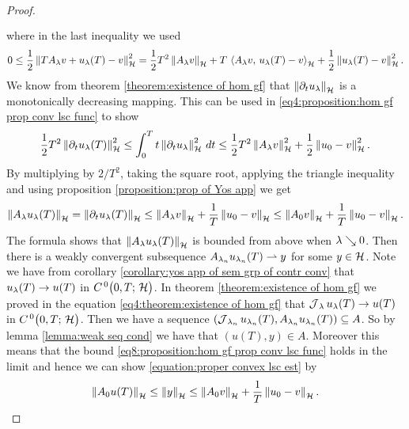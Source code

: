 \begin{proof}
\begin{align}
\begin{split}
		\end{split}
	\end{align}
	where in the last inequality we used
	\begin{align*}
		0\leq 
		\frac{1}{2}\left\Vert T A_\lambda v+u_\lambda(T)-v\right\Vert_{\mathcal{H}}^2
		=\frac{1}{2}T^2\left\Vert A_\lambda v\right\Vert_{\mathcal{H}}
		+T\,\left\langle A_\lambda v,\,u_\lambda(T)-v\right\rangle_{\mathcal{H}}
		+\frac{1}{2}\left\Vert u_\lambda(T)-v\right\Vert_{\mathcal{H}}^2.
	\end{align*}
	We know from theorem \ref{theorem:existence of hom gf} that 
	$ \left\Vert \partial_t u_\lambda\right\Vert_{\mathcal{H}} $ is a monotonically decreasing
	mapping. This can be used in 
	\eqref{eq4:proposition:hom gf prop conv lsc func} to show
	\begin{align*}
		\frac{1}{2}T^2 \left\Vert \partial_t u_\lambda(T)\right\Vert_{\mathcal{H}}^2
		\leq 
		\int_0^T t\left\Vert \partial_t u_\lambda\right\Vert_{\mathcal{H}}^2\,dt
		\leq \frac{1}{2}T^2\left\Vert A_\lambda v\right\Vert_{\mathcal{H}}^2+\frac{1}{2}\left\Vert u_0-v\right\Vert_{\mathcal{H}}^2.
	\end{align*}
	By multiplying by $ 2/T^2 $, taking the square root,
	applying the triangle inequality 
	and using proposition \ref{proposition:prop of Yos app}
	we get 
	\begin{align}\label{eq8:proposition:hom gf prop conv lsc func}
		\left\Vert A_\lambda u_\lambda(T)\right\Vert_{\mathcal{H}}
		=\left\Vert \partial_t u_\lambda(T)\right\Vert_{\mathcal{H}}
		\leq \left\Vert A_\lambda v\right\Vert_{\mathcal{H}}+\frac{1}{T}\left\Vert u_0-v\right\Vert_{\mathcal{H}}
		\leq \left\Vert A_0 v\right\Vert_{\mathcal{H}}+\frac{1}{T}\left\Vert u_0-v\right\Vert_{\mathcal{H}}.
	\end{align}
	The formula shows that $ \left\Vert A_\lambda u_\lambda(T)\right\Vert_{\mathcal{H}} $
	is bounded from above when $ \lambda\searrow 0 $. Then
	there is a weakly convergent subsequence
	$ A_{\lambda_n} u_{\lambda_n}(T)\rightharpoonup y$
	for some $ y\in\mathcal{H} $. Note we have from corollary 
	\ref{corollary:yos app of sem grp of contr conv}
	that $ u_\lambda(T)\rightarrow u(T)$ in $ C^{\, 0}\big(0,T;\,\mathcal{H}\big) $. In theorem
	\ref{theorem:existence of hom gf} we proved
	in the equation \eqref{eq4:theorem:existence of hom gf}
	that $ \operatorname{\mathcal{J}}_\lambda u_\lambda(T)\rightarrow u(T) $
	in $ C^{\, 0}\big(0,T;\,\mathcal{H}\big) $. Then we have a sequence
	$ (\operatorname{\mathcal{J}}_{\lambda_n}u_{\lambda_n}(T),A_{\lambda_n}u_{\lambda_n}(T))
	\subseteq A$. So by lemma \ref{lemma:weak seq cond}
	we have that $ (u(T),y)\in A $. Moreover this 
	means that the bound \eqref{eq8:proposition:hom gf prop conv lsc func}
	holds in the limit and hence we can show 
	\eqref{equation:proper convex lsc est} by
	\begin{align*}
		\left\Vert A_0 u(T)\right\Vert_{\mathcal{H}}
		\leq \left\Vert y\right\Vert_{\mathcal{H}}
		\leq \left\Vert A_0 v\right\Vert_{\mathcal{H}}+\frac{1}{T}\left\Vert u_0-v\right\Vert_{\mathcal{H}}.
	\end{align*}
	

\end{proof}
